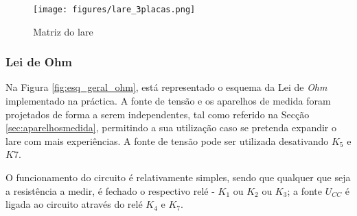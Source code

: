\begin{figure}[hbtp]
	\centering
	\texttt{[image: figures/lare\_3placas.png]}
	\caption{Matriz do \acrshort{lare}}
	\label{fig:matrizlare}
\end{figure}

\subsubsection{Lei de Ohm}
\label{sec:lei_ohm}
Na Figura \ref{fig:esq_geral_ohm}, está representado o esquema da Lei de \textit{Ohm} implementado na práctica. A fonte de tensão e os aparelhos de medida foram projetados de forma a serem independentes, tal como referido na Secção \ref{sec:aparelhosmedida}, permitindo a sua utilização caso se pretenda expandir o \acrshort{lare} com mais experiências. A fonte de tensão pode ser utilizada desativando $K_{5}$ e $K7$.

O funcionamento do circuito é relativamente simples, sendo que qualquer que seja a resistência a medir, é fechado o respectivo relé - $K_{1}$ ou $K_{2}$ ou $K_{3}$; a fonte $U_{CC}$ é ligada ao circuito através do relé $K_{4}$ e $K_{7}$.

